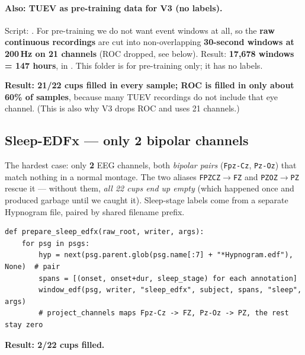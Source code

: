 \documentclass[11pt]{article}
\begin{document}
\paragraph{Also: TUEV as pre-training data for V3 (no labels).}
Script: . For pre-training we do not want
event windows at all, so the \textbf{raw continuous recordings} are cut into
non-overlapping \textbf{30-second windows at 200\,Hz on 21 channels} (ROC dropped,
see below). Result: \textbf{17,678 windows = 147 hours}, in
. This folder is for pre-training only;
it has no labels.

\textbf{Result: 21/22 cups filled in every sample; ROC is filled in only about
60\% of samples}, because many TUEV recordings do not include that eye channel.
(This is also why V3 drops ROC and uses 21 channels.)

\subsection*{Sleep-EDFx --- only 2 bipolar channels}
The hardest case: only \textbf{2} EEG channels, both \emph{bipolar pairs}
(\texttt{Fpz-Cz}, \texttt{Pz-Oz}) that match nothing in a normal montage. The two
aliases \texttt{FPZCZ$\rightarrow$FZ} and \texttt{PZOZ$\rightarrow$PZ} rescue it
--- without them, \emph{all 22 cups end up empty} (which happened once and
produced garbage until we caught it). Sleep-stage labels come from a separate
Hypnogram file, paired by shared filename prefix.
\begin{lstlisting}
def prepare_sleep_edfx(raw_root, writer, args):
    for psg in psgs:
        hyp = next(psg.parent.glob(psg.name[:7] + "*Hypnogram.edf"), None)  # pair
        spans = [(onset, onset+dur, sleep_stage) for each annotation]
        window_edf(psg, writer, "sleep_edfx", subject, spans, "sleep", args)
        # project_channels maps Fpz-Cz -> FZ, Pz-Oz -> PZ, the rest stay zero
\end{lstlisting}
\textbf{Result: 2/22 cups filled.}

\end{document}
